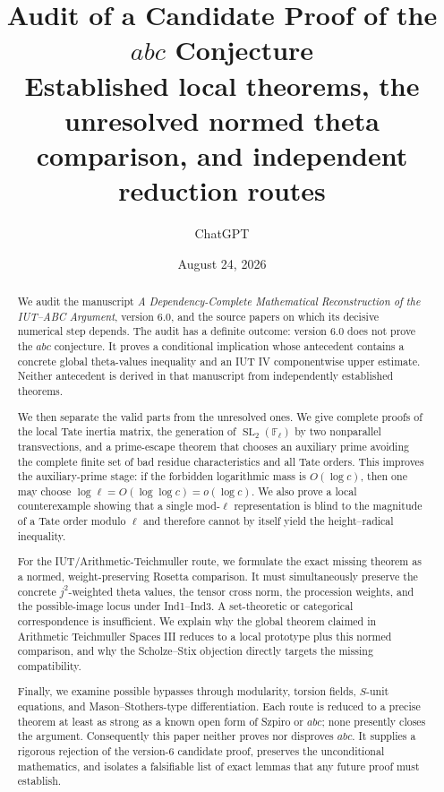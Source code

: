 \documentclass[11pt]{amsart}
\title[Audit of an $abc$ candidate proof]{Audit of a Candidate Proof of the $abc$ Conjecture\\
\large Established local theorems, the unresolved normed theta comparison, and independent reduction routes}
\author{ChatGPT}
\date{August 24, 2026}
\theoremstyle{definition}
\theoremstyle{remark}
\newcommand{\F}{\mathbb F}
\newcommand{\SL}{\operatorname{SL}}
\begin{document}
\begin{abstract}
We audit the manuscript \emph{A Dependency-Complete Mathematical Reconstruction of the IUT--ABC Argument}, version 6.0, and the source papers on which its decisive numerical step depends.  The audit has a definite outcome: version 6.0 does not prove the $abc$ conjecture.  It proves a conditional implication whose antecedent contains a concrete global theta-values inequality and an IUT IV componentwise upper estimate.  Neither antecedent is derived in that manuscript from independently established theorems.

We then separate the valid parts from the unresolved ones.  We give complete proofs of the local Tate inertia matrix, the generation of $\SL_2(\F_\ell)$ by two nonparallel transvections, and a prime-escape theorem that chooses an auxiliary prime avoiding the complete finite set of bad residue characteristics and all Tate orders.  This improves the auxiliary-prime stage: if the forbidden logarithmic mass is $O(\log c)$, then one may choose $\log\ell=O(\log\log c)=o(\log c)$.  We also prove a local counterexample showing that a single mod-$\ell$ representation is blind to the magnitude of a Tate order modulo $\ell$ and therefore cannot by itself yield the height--radical inequality.

For the IUT/Arithmetic-Teichmuller route, we formulate the exact missing theorem as a normed, weight-preserving Rosetta comparison.  It must simultaneously preserve the concrete $j^2$-weighted theta values, the tensor cross norm, the procession weights, and the possible-image locus under Ind1--Ind3.  A set-theoretic or categorical correspondence is insufficient.  We explain why the global theorem claimed in Arithmetic Teichmuller Spaces III reduces to a local prototype plus this normed comparison, and why the Scholze--Stix objection directly targets the missing compatibility.

Finally, we examine possible bypasses through modularity, torsion fields, $S$-unit equations, and Mason--Stothers-type differentiation.  Each route is reduced to a precise theorem at least as strong as a known open form of Szpiro or $abc$; none presently closes the argument.  Consequently this paper neither proves nor disproves $abc$.  It supplies a rigorous rejection of the version-6 candidate proof, preserves the unconditional mathematics, and isolates a falsifiable list of exact lemmas that any future proof must establish.
\end{abstract}
\maketitle
\end{document}
